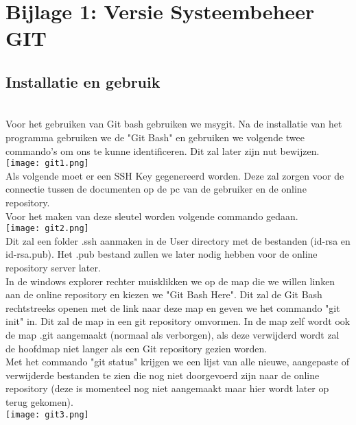 \label{Bijlage 1}

\appendix
\section{Bijlage 1: Versie Systeembeheer GIT}

\subsection*{Installatie en gebruik}\ \\[12pt]

Voor het gebruiken van Git bash gebruiken we msygit. Na de installatie van het programma gebruiken we de "Git Bash" en gebruiken we volgende twee commando's om ons te kunne identificeren. Dit zal later zijn nut bewijzen.\\
\texttt{[image: git1.png]}\\


Als volgende moet er een SSH Key gegenereerd worden. Deze zal zorgen voor de connectie tussen de documenten op de pc van de gebruiker en de online repository.\\

Voor het maken van deze sleutel worden volgende commando gedaan.\\
\texttt{[image: git2.png]}\\

Dit zal een folder .ssh aanmaken in de User directory met de bestanden (id-rsa en id-rsa.pub). Het .pub bestand zullen we later nodig hebben voor de online repository server later.\\

In de windows explorer rechter muisklikken we op de map die we willen linken aan de online repository en kiezen we "Git Bash Here". Dit zal de Git Bash rechtstreeks openen met de link naar deze map en geven we het commando "git init" in. Dit zal de map in een git repository omvormen. In de map zelf wordt ook de map .git aangemaakt (normaal als verborgen), als deze verwijderd wordt zal de hoofdmap niet langer als een Git repository gezien worden.\\

Met het commando "git status" krijgen we een lijst van alle nieuwe, aangepaste of verwijderde bestanden te zien die nog niet doorgevoerd zijn naar de online repository (deze is momenteel nog niet aangemaakt maar hier wordt later op terug gekomen).\\
\texttt{[image: git3.png]}\\

